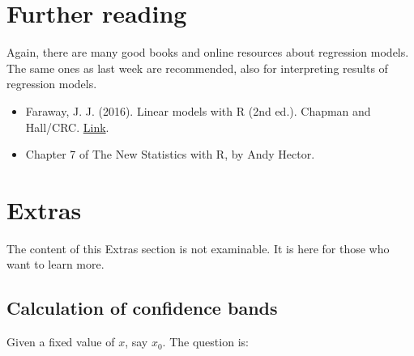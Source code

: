 \documentclass[
  letterpaper,
  8pt,
  a4paper]{book}
\providecommand{\tightlist}{%
  \setlength{\itemsep}{0pt}\setlength{\parskip}{0pt}}
\begin{document}
\section*{Further reading}\label{further-reading-2}


Again, there are many good books and online resources about regression
models. The same ones as last week are recommended, also for
interpreting results of regression models.

\begin{itemize}
\tightlist
\item
  Faraway, J. J. (2016). Linear models with R (2nd ed.). Chapman and
  Hall/CRC.
  \href{https://www.routledge.com/Linear-Models-with-R-2nd-Edition/Faraway/p/book/9781482215754}{Link}.
\item
  Chapter 7 of The New Statistics with R, by Andy Hector.
\end{itemize}

\section*{Extras}\label{extras-2}


\begin{tcolorbox}[enhanced jigsaw, arc=.35mm, bottomrule=.15mm, bottomtitle=1mm, breakable, colback=white, colbacktitle=quarto-callout-note-color!10!white, colframe=quarto-callout-note-color-frame, coltitle=black, left=2mm, leftrule=.75mm, opacityback=0, opacitybacktitle=0.6, rightrule=.15mm, title=\textcolor{quarto-callout-note-color}{\faInfo}\hspace{0.5em}{Note}, titlerule=0mm, toprule=.15mm, toptitle=1mm]

The content of this Extras section is not examinable. It is here for
those who want to learn more.

\end{tcolorbox}

\subsection*{Calculation of confidence
bands}\label{calculation-of-confidence-bands}

Given a fixed value of \(x\), say \(x_0\). The question is:
\end{document}
